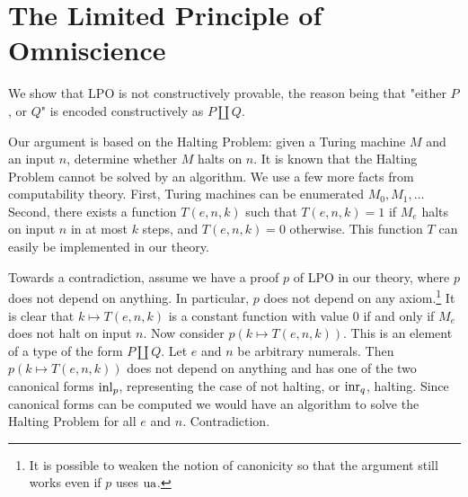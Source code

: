 \section{The Limited Principle of Omniscience}

\begin{remark}\label{rem:LPO-solves-halting problem}
We show that LPO is not constructively provable, the reason being that
"either $P$, or $Q$" is encoded constructively as $P\coprod Q$.

Our argument is based on the Halting Problem: given a Turing machine 
$M$ and an input $n$, determine whether $M$ halts on $n$.
It is known that the Halting Problem cannot be solved by an algorithm.
We use a few more facts from computability theory.
First, Turing machines can be enumerated $M_0,M_1,\ldots$
Second, there exists a function $T(e,n,k)$ such that $T(e,n,k) = 1$
if $M_e$ halts on input $n$ in at most $k$ steps, and $T(e,n,k) = 0$
otherwise. This function $T$ can easily be implemented in our theory.

Towards a contradiction, assume we have a proof $p$ of LPO in our theory,
where $p$ does not depend on anything. In particular, $p$ does not
depend on any axiom.\footnote{It is possible to weaken the notion
of canonicity so that the argument still works even if $p$ uses $\ua$.}
It is clear that $k\mapsto T(e,n,k)$ is a constant function with value $0$
if and only if $M_e$ does not halt on input $n$. Now consider $p(k\mapsto T(e,n,k))$.
This is an element of a type of the form $P\coprod Q$. Let $e$ and $n$ be
arbitrary numerals. Then $p(k\mapsto T(e,n,k))$ does not depend on anything
and has one of the two canonical forms $\inl{p}$, representing the case
of not halting, or $\inr{q}$, halting. Since canonical forms
can be computed we would have an algorithm to solve the Halting Problem
for all $e$ and $n$. Contradiction.
\end{remark}
